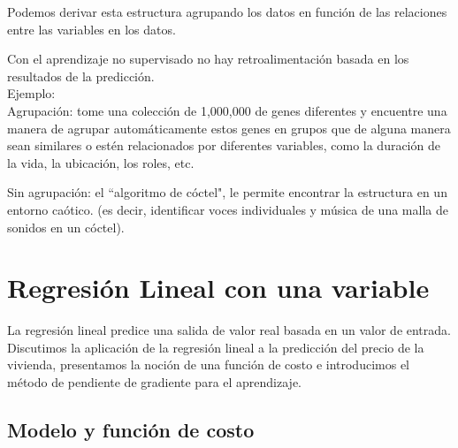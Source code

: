\documentclass{report}
\begin{document}
Podemos derivar esta estructura agrupando los datos en función de las relaciones entre las variables en los datos.

Con el aprendizaje no supervisado no hay retroalimentación basada en los resultados de la predicción.\\

Ejemplo:\\

Agrupación: tome una colección de 1,000,000 de genes diferentes y encuentre una manera de agrupar automáticamente estos genes en grupos que de alguna manera sean similares o estén relacionados por diferentes variables, como la duración de la vida, la ubicación, los roles, etc.

Sin agrupación: el ``algoritmo de cóctel", le permite encontrar la estructura en un entorno caótico. (es decir, identificar voces individuales y música de una malla de sonidos en un cóctel).

\chapter{Regresión Lineal con una variable}
La regresión lineal predice una salida de valor real basada en un valor de entrada. Discutimos la aplicación de la regresión lineal a la predicción del precio de la vivienda, presentamos la noción de una función de costo e introducimos el método de pendiente de gradiente para el aprendizaje.
\section{Modelo y función de costo}
\end{document}
